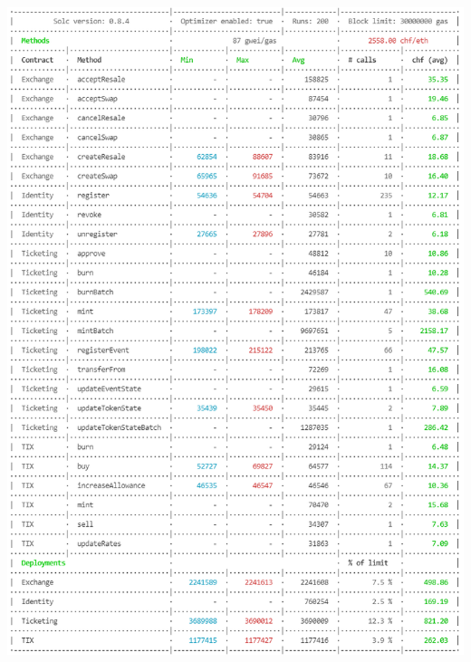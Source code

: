 \documentclass[a4paper,11pt,oneside]{report}
\begin{document}
\includegraphics[width=\textwidth]{marketplace_price_ethereum_01_02_2022.PNG}
\end{document}
